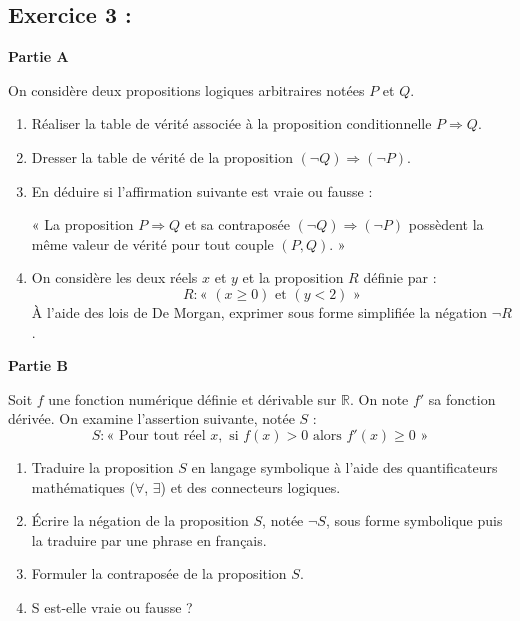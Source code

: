\documentclass[12pt,a4paper]{article}
\begin{document}
\subsection*{Exercice 3 :}

\vspace{0.4cm}

\begin{center}
\textbf{Partie A}
\end{center}
On considère deux propositions logiques arbitraires notées $P$ et $Q$.

\begin{enumerate}[label=\textbf{\arabic*.}]
    \item Réaliser la table de vérité associée à la proposition conditionnelle $P \Rightarrow Q$.
    
    \item Dresser la table de vérité de la proposition $(\neg Q) \Rightarrow (\neg P)$.
    
    \item En déduire si l'affirmation suivante est vraie ou fausse : 
    \begin{center}
        « La proposition $P \Rightarrow Q$ et sa contraposée $(\neg Q) \Rightarrow (\neg P)$ possèdent la même valeur de vérité pour tout couple $(P, Q)$. »
    \end{center}
    
    \item On considère les deux réels $x$ et $y$ et la proposition $R$ définie par :
    \[ R : \text{« } (x \ge 0) \text{ et } (y < 2) \text{ »} \]
    À l'aide des lois de De Morgan, exprimer sous forme simplifiée la négation $\neg R$.
\end{enumerate}

\vspace{0.4cm}

\begin{center}
\textbf{Partie B}
\end{center}
Soit $f$ une fonction numérique définie et dérivable sur $\mathbb{R}$. On note $f'$ sa fonction dérivée.
On examine l'assertion suivante, notée $S$ :
\[ S : \text{« Pour tout réel } x, \text{ si } f(x) > 0 \text{ alors } f'(x) \ge 0 \text{ »} \]

\begin{enumerate}[label=\textbf{\arabic*.}]
    \item Traduire la proposition $S$ en langage symbolique à l'aide des quantificateurs mathématiques ($\forall$, $\exists$) et des connecteurs logiques.
    
    \item Écrire la négation de la proposition $S$, notée $\neg S$, sous forme symbolique puis la traduire par une phrase en français.
    
    \item Formuler la contraposée de la proposition $S$.
    
    \item S est-elle vraie ou fausse ? 
\end{enumerate}
\end{document}

